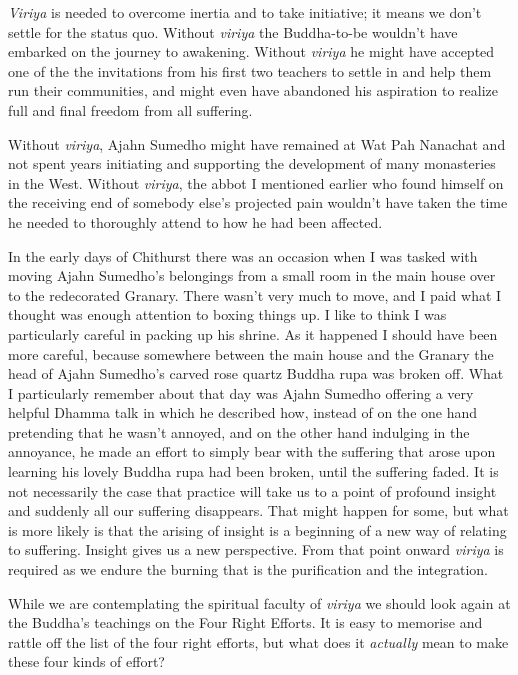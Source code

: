 \emph{Viriya} is needed to overcome inertia and to take initiative; it means
we don't settle for the status quo. Without \emph{viriya} the Buddha-to-be
wouldn't have embarked on the journey to awakening. Without \emph{viriya} he
might have accepted one of the the invitations from his first two teachers to settle
in and help them run their communities, and might even have abandoned
his aspiration to realize full and final freedom from all suffering.

Without \emph{viriya}, Ajahn Sumedho might have remained at Wat Pah Nanachat
and not spent years initiating and supporting the development of many
monasteries in the West. Without \emph{viriya}, the abbot I mentioned earlier who found himself on the receiving end of somebody else's projected pain wouldn't have taken the time he needed to thoroughly attend to how he had been affected.

In the early days of Chithurst there was an occasion when I was tasked
with moving Ajahn Sumedho's belongings from a small room in the main
house over to the redecorated Granary. There wasn't very much to move,
and I paid what I thought was enough attention to boxing things up. I
like to think I was particularly careful in packing up his shrine. As it
happened I should have been more careful, because somewhere between the
main house and the Granary the head of Ajahn Sumedho's carved rose
quartz Buddha rupa was broken off. What I particularly remember about
that day was Ajahn Sumedho offering a very helpful Dhamma talk in which
he described how, instead of on the one hand pretending that he wasn't
annoyed, and on the other hand indulging in the annoyance, he made an
effort to simply bear with the suffering that arose upon learning his
lovely Buddha rupa had been broken, until the suffering faded. It is not
necessarily the case that practice will take us to a point of profound
insight and suddenly all our suffering disappears. That might happen for
some, but what is more likely is that the arising of insight is a
beginning of a new way of relating to suffering. Insight gives us a new
perspective. From that point onward \emph{viriya} is required as we endure
the burning that is the purification and the integration.

While we are contemplating the spiritual faculty of \emph{viriya} we should
look again at the Buddha's teachings on the Four Right Efforts. It is
easy to memorise and rattle off the list of the four right efforts, but
what does it \emph{actually} mean to make these four kinds of effort?

